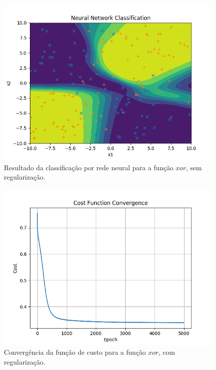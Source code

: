 \documentclass[conference]{IEEEtran}
\begin{document}
\begin{figure}[htbp]
\centering
\centerline{\includegraphics[scale=0.5]{imagens/xor/lambda_zero/nn_classification_xor.png}}
\caption{Resultado da classificação por rede neural para a função $xor$, sem regularização.}
\label{xor/lambda_zero/nn_classification_xor}
\end{figure}

\begin{figure}[htbp]
\centering
\centerline{\includegraphics[scale=0.5]{imagens/xor/convergence_xor.png}}
\caption{Convergência da função de custo para a função $xor$, com regularização.}
\label{xor/convergence_xor}
\end{figure}
\end{document}
